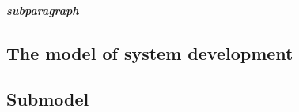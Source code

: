 \documentclass[xlevel, hyperref, nat, mp, en]{fgdh-thesis}
\begin{document}
\subparagraph{subparagraph}
\label{sec:subparagraph}



\begin{appendix}  
  \listoffigures

  \listoftables

  \listofabbreviations


  
  
  \begin{appendices}
  \section{The model of system development}
  \newpage
  \subsection{Submodel}

  \end{appendices}
  \declaration
\end{appendix}
\end{document}
